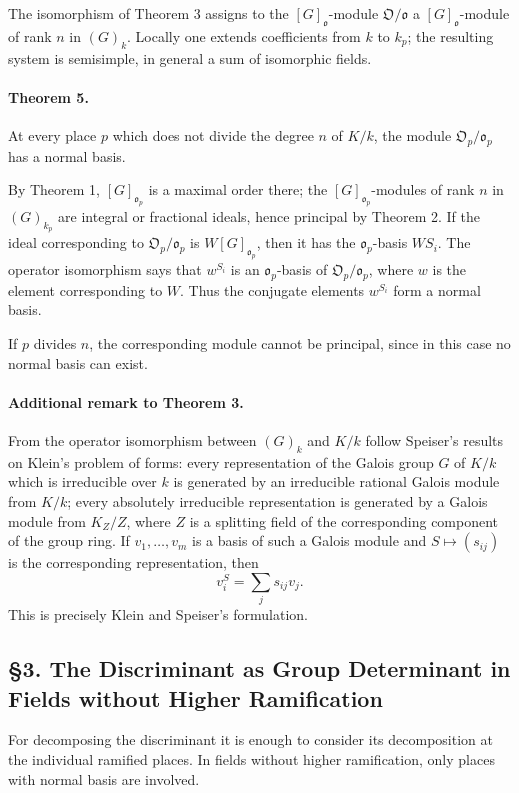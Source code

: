 \documentclass[11pt]{article}
\providecommand{\frako}{\mathfrak o}
\providecommand{\frakO}{\mathfrak O}
\begin{document}
The isomorphism of Theorem 3 assigns to the \([G]_{\frako}\)-module \(\frakO/\frako\) a \([G]_{\frako}\)-module of rank \(n\) in \((G)_k\). Locally one extends coefficients from \(k\) to \(k_p\); the resulting system is semisimple, in general a sum of isomorphic fields.

\paragraph{Theorem 5.}
At every place \(p\) which does not divide the degree \(n\) of \(K/k\), the module \(\frakO_p/\frako_p\) has a normal basis.

By Theorem 1, \([G]_{\frako_p}\) is a maximal order there; the \([G]_{\frako_p}\)-modules of rank \(n\) in \((G)_{k_p}\) are integral or fractional ideals, hence principal by Theorem 2. If the ideal corresponding to \(\frakO_p/\frako_p\) is \(W[G]_{\frako_p}\), then it has the \(\frako_p\)-basis \(WS_i\). The operator isomorphism says that \(w^{S_i}\) is an \(\frako_p\)-basis of \(\frakO_p/\frako_p\), where \(w\) is the element corresponding to \(W\). Thus the conjugate elements \(w^{S_i}\) form a normal basis.

If \(p\) divides \(n\), the corresponding module cannot be principal, since in this case no normal basis can exist.

\paragraph{Additional remark to Theorem 3.}
From the operator isomorphism between \((G)_k\) and \(K/k\) follow Speiser's results on Klein's problem of forms: every representation of the Galois group \(G\) of \(K/k\) which is irreducible over \(k\) is generated by an irreducible rational Galois module from \(K/k\); every absolutely irreducible representation is generated by a Galois module from \(K_Z/Z\), where \(Z\) is a splitting field of the corresponding component of the group ring. If \(v_1,\ldots,v_m\) is a basis of such a Galois module and \(S\mapsto (s_{ij})\) is the corresponding representation, then
\[
        v_i^S=\sum_j s_{ij}v_j.
\]
This is precisely Klein and Speiser's formulation.

\subsection*{§3. The Discriminant as Group Determinant in Fields without Higher Ramification}

For decomposing the discriminant it is enough to consider its decomposition at the individual ramified places. In fields without higher ramification, only places with normal basis are involved.
\end{document}
